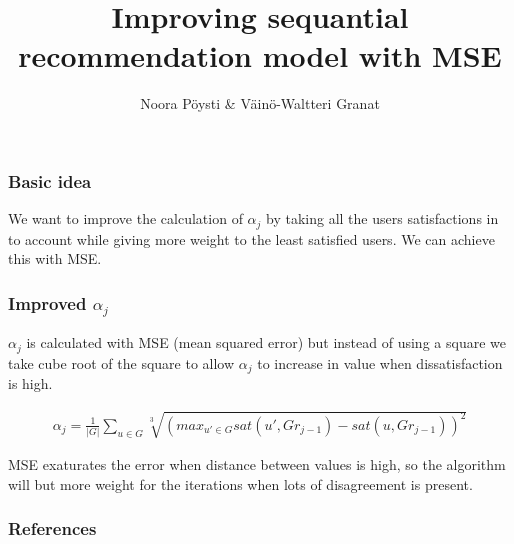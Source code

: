 \documentclass{beamer}
\title{Improving sequantial recommendation model with MSE}
\author{Noora Pöysti \& Väinö-Waltteri Granat}
\begin{document}
\frame{\titlepage}


\begin{frame}
    \frametitle{Basic idea}
    We want to improve the calculation of $\alpha_{j}$ by taking all the users satisfactions in to account while
    giving more weight to the least satisfied users. We can achieve this with MSE.
\end{frame}

\begin{frame}
    \frametitle{Improved $\alpha_j$}

    $\alpha_j$ is calculated with MSE (mean squared error) but instead of using a square we take cube root of the square
    to allow $\alpha_j$ to increase in value when dissatisfaction is high.

    \begin{align*}
    \alpha_j = \frac{1}{|G|} \sum_{u\in G} \sqrt[3]{(max_{u'\in G} sat(u',Gr_{j-1}) - sat(u, Gr_{j-1}))^2}
    \end{align*}

    MSE exaturates the error when distance between values is high, so the algorithm will but more weight for the iterations 
    when lots of disagreement is present.
\end{frame}

\begin{frame}
   \frametitle{References} 
   \printbibliography
\end{frame}
\end{document}
